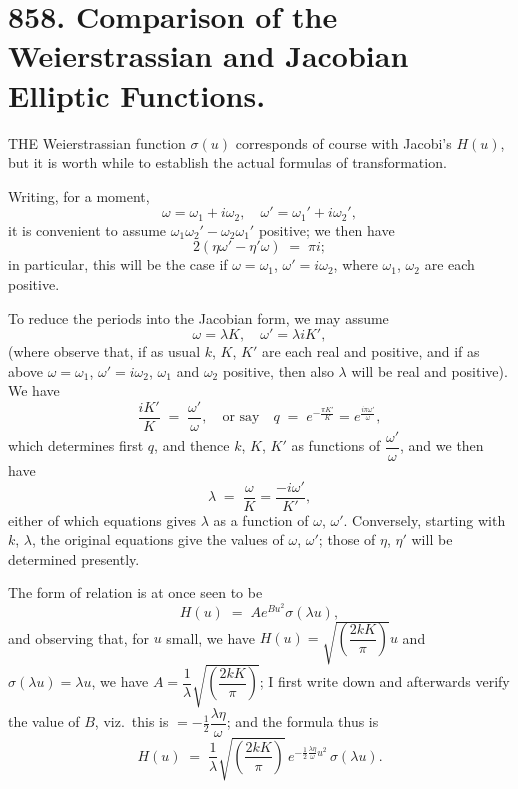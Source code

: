 \documentclass[11pt]{article}
\begin{document}
\vfill

\newpage

\section*{858. Comparison of the Weierstrassian and Jacobian Elliptic Functions.}


\medskip

\noindent THE Weierstrassian function $\sigma(u)$ corresponds of course with Jacobi's $H(u)$, but it is worth while to establish the actual formulas of transformation.

Writing, for a moment,
\[
\omega = \omega_1 + i\omega_2,\quad \omega' = \omega_1' + i\omega_2',
\]
it is convenient to assume $\omega_1\omega_2' - \omega_2\omega_1'$ positive; we then have
\[
2(\eta\omega' - \eta'\omega) \;=\; \pi i;
\]
in particular, this will be the case if $\omega = \omega_1$, $\omega' = i\omega_2$, where $\omega_1$, $\omega_2$ are each positive.

To reduce the periods into the Jacobian form, we may assume
\[
\omega = \lambda K,\quad \omega' = \lambda i K',
\]
(where observe that, if as usual $k$, $K$, $K'$ are each real and positive, and if as above $\omega = \omega_1$, $\omega' = i\omega_2$, $\omega_1$ and $\omega_2$ positive, then also $\lambda$ will be real and positive). We have
\[
\frac{iK'}{K} \;=\; \frac{\omega'}{\omega},\quad \text{or say}\quad q \;=\; e^{-\tfrac{\pi K'}{K}} = e^{\tfrac{i\pi\omega'}{\omega}},
\]
which determines first $q$, and thence $k$, $K$, $K'$ as functions of $\dfrac{\omega'}{\omega}$, and we then have
\[
\lambda \;=\; \frac{\omega}{K} = \frac{-i\omega'}{K'},
\]
either of which equations gives $\lambda$ as a function of $\omega$, $\omega'$. Conversely, starting with $k$, $\lambda$, the original equations give the values of $\omega$, $\omega'$; those of $\eta$, $\eta'$ will be determined presently.

\medskip

The form of relation is at once seen to be
\[
H(u) \;=\; A e^{Bu^2}\!\sigma(\lambda u),
\]
and observing that, for $u$ small, we have $H(u) = \sqrt{\!\left(\dfrac{2kK}{\pi}\right)}u$ and $\sigma(\lambda u) = \lambda u$, we have $A = \dfrac{1}{\lambda}\sqrt{\!\left(\dfrac{2kK}{\pi}\right)}$; I first write down and afterwards verify the value of $B$, viz.\ this is $=-\tfrac{1}{2}\dfrac{\lambda\eta}{\omega}$; and the formula thus is
\[
H(u) \;=\; \frac{1}{\lambda}\sqrt{\!\left(\frac{2kK}{\pi}\right)}\,e^{-\tfrac{1}{2}\tfrac{\lambda\eta}{\omega}u^2}\,\sigma(\lambda u).
\]
\end{document}
